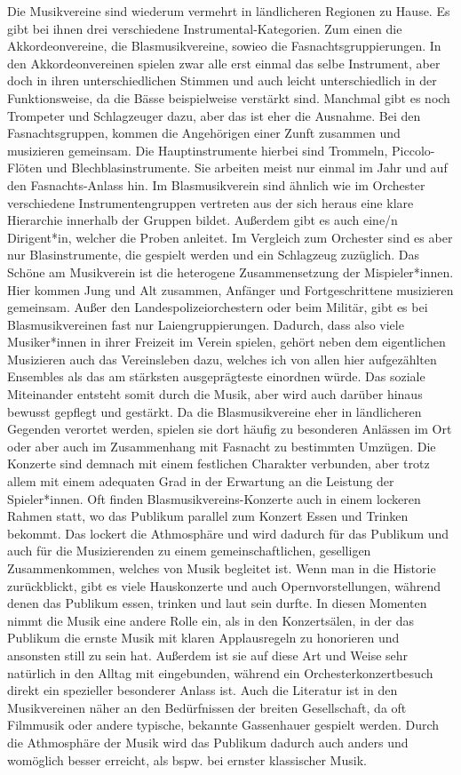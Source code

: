 Die Musikvereine sind wiederum vermehrt in ländlicheren Regionen zu Hause. Es
gibt bei ihnen drei verschiedene Instrumental-Kategorien. Zum einen die
Akkordeonvereine, die Blasmusikvereine, sowieo die Fasnachtsgruppierungen. In
den Akkordeonvereinen spielen zwar alle erst einmal das selbe Instrument, aber
doch in ihren unterschiedlichen Stimmen und auch leicht unterschiedlich in der
Funktionsweise, da die Bässe beispielweise verstärkt sind. Manchmal gibt es noch
Trompeter und Schlagzeuger dazu, aber das ist eher die Ausnahme. Bei den
Fasnachtsgruppen, kommen die Angehörigen einer Zunft zusammen und musizieren
gemeinsam. Die Hauptinstrumente hierbei sind Trommeln, Piccolo-Flöten und
Blechblasinstrumente. Sie arbeiten meist nur einmal im Jahr und auf den
Fasnachts-Anlass hin. Im Blasmusikverein sind ähnlich wie im Orchester
verschiedene Instrumentengruppen vertreten aus der sich heraus eine klare
Hierarchie innerhalb der Gruppen bildet. Außerdem gibt es auch eine/n
Dirigent*in, welcher die Proben anleitet. Im Vergleich zum Orchester sind es
aber nur Blasinstrumente, die gespielt werden und ein Schlagzeug zuzüglich. Das
Schöne am Musikverein ist die heterogene Zusammensetzung der Mispieler*innen.
Hier kommen Jung und Alt zusammen, Anfänger und Fortgeschrittene musizieren
gemeinsam. Außer den Landespolizeiorchestern oder beim Militär, gibt es bei
Blasmusikvereinen fast nur Laiengruppierungen. Dadurch, dass also viele
Musiker*innen in ihrer Freizeit im Verein spielen, gehört neben dem eigentlichen
Musizieren auch das Vereinsleben dazu, welches ich von allen hier aufgezählten
Ensembles als das am stärksten ausgeprägteste einordnen würde. Das soziale
Miteinander entsteht somit durch die Musik, aber wird auch darüber hinaus
bewusst gepflegt und gestärkt. Da die Blasmusikvereine eher in ländlicheren
Gegenden verortet werden, spielen sie dort häufig zu besonderen Anlässen im Ort
oder aber auch im Zusammenhang mit Fasnacht zu bestimmten Umzügen. Die Konzerte
sind demnach mit einem festlichen Charakter verbunden, aber trotz allem mit
einem adequaten Grad in der Erwartung an die Leistung der Spieler*innen. Oft
finden Blasmusikvereins-Konzerte auch in einem lockeren Rahmen statt, wo das
Publikum parallel zum Konzert Essen und Trinken bekommt. Das lockert die
Athmosphäre und wird dadurch für das Publikum und auch für die Musizierenden zu
einem gemeinschaftlichen, geselligen Zusammenkommen, welches von Musik begleitet
ist. Wenn man in die Historie zurückblickt, gibt es viele Hauskonzerte und auch
Opernvorstellungen, während denen das Publikum essen, trinken und laut sein
durfte. In diesen Momenten nimmt die Musik eine andere Rolle ein, als in den
Konzertsälen, in der das Publikum die ernste Musik mit klaren Applausregeln zu
honorieren und ansonsten still zu sein hat. Außerdem ist sie auf diese Art und
Weise sehr natürlich in den Alltag mit eingebunden, während ein
Orchesterkonzertbesuch direkt ein spezieller besonderer Anlass ist. Auch die
Literatur ist in den Musikvereinen näher an den Bedürfnissen der breiten
Gesellschaft, da oft Filmmusik oder andere typische, bekannte Gassenhauer
gespielt werden. Durch die Athmosphäre der Musik wird das Publikum dadurch auch
anders und womöglich besser erreicht, als bspw. bei ernster klassischer Musik. 



